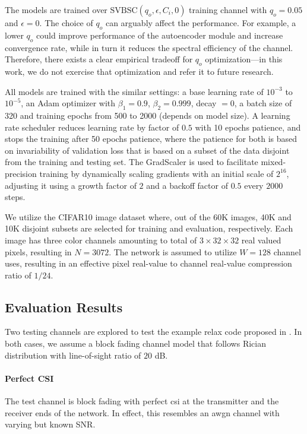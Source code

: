 The models  are trained over  $\text{SVBSC}(q_o,\epsilon, C_i, 0)$ training channel with $q_o = 0.05$ and $\epsilon = 0$. The choice of $q_o$ can arguably affect the performance. For example, a lower $q_o$ could improve  performance of the autoencoder module and increase convergence rate, while in turn it reduces the spectral efficiency of the channel. Therefore, there exists  a clear empirical tradeoff for $q_o$ optimization---in this work, we do not exercise that optimization and refer it to future research.

All models are trained with the similar settings: a base learning rate of $10^{-3}$ to $10^{-5}$, an  Adam optimizer with $\beta_1 = 0.9$, $\beta_2 = 0.999$, decay $= 0$, a batch size of 320  and training epochs from 500 to 2000 (depends on model size). A learning rate scheduler reduces learning rate by factor of $0.5$ with 10 epochs patience, and stops the training after 50 epochs patience, where the patience for both is based on invariability of validation loss that is based on  a  subset of the data disjoint from the training and testing set. The GradScaler is used to facilitate mixed-precision training \cite{paszke2019pytorch} by dynamically scaling gradients with an initial scale of  $2^{16}$, adjusting it using a growth factor of $2$ and a backoff factor of $0.5$ every $2000$ steps.

We utilize the CIFAR10 image dataset \cite{krizhevsky09_learn_multip_layer_featur_tiny_images} where, out of the 60K images, 40K and 10K disjoint subsets are  selected for training and evaluation, respectively. Each image has three color channels amounting to total of $3 \times 32 \times 32$ real valued pixels, resulting in $N = 3072$. The network is assumed to utilize $W = 128$ channel uses, resulting in an effective pixel real-value to channel real-value compression ratio of $1/24$. 

\subsection{Evaluation Results}


Two testing channels are explored to test the example \gls{relax} code proposed in . In both cases, we assume a block fading channel model that follows Rician distribution  with line-of-sight ratio of $20$ dB.


\paragraph*{Perfect CSI}  The test channel is block fading with perfect \gls{csi} at the transmitter and the receiver ends of the network. In effect, this resembles an \gls{awgn} channel with varying but known SNR.

